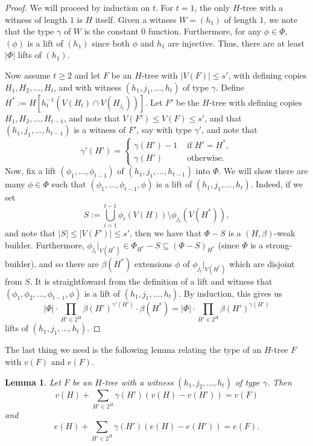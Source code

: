 \documentclass[12pt,letterpaper]{article}
\newtheorem{lemma}[theorem]{Lemma}
\theoremstyle{definition}
\begin{document}
	\begin{proof}
		We will proceed by induction on $t$. For $t=1$, the only $H$-tree with a witness of length $1$ is $H$ itself. Given a witness $W=(h_1)$ of length $1$, we note that the type $\gamma$ of $W$ is the constant $0$ function. Furthermore, for any $\phi\in \Phi$, $(\phi)$ is a lift of $(h_1)$ since both $\phi$ and $h_1$ are injective. Thus, there are at least $|\Phi|$ lifts of $(h_1)$.
		
		Now assume $t\geq 2$ and let $F$ be an $H$-tree with $|V(F)|\leq s'$, with defining copies $H_1,H_2,\dots,H_t$, and with witness $(h_1,j_1,\dots,h_t)$ of type $\gamma$. Define $H^*:=H[h_t^{-1}(V(H_t)\cap V(H_{j_t}))]$. Let $F'$ be the $H$-tree with defining copies $H_1,H_2,\dots,H_{t-1}$, and note that $V(F')\leq V(F)\leq s'$, and that $(h_1,j_1,\dots,h_{t-1})$ is a witness of $F'$, say with type $\gamma'$, and note that
		\[
		\gamma'(H')=\begin{cases}
			\gamma(H')-1&\text{ if }H'=H^*,\\
			\gamma(H')&\text{ otherwise}.
		\end{cases}
		\]
		Now, fix a lift $(\phi_1,\dots,\phi_{t-1})$ of $(h_1,j_1,\dots,h_{t-1})$ into $\Phi$. We will show there are many $\phi\in \Phi$ such that $(\phi_1,\dots,\phi_{t-1},\phi)$ is a lift of $(h_1,j_1,\dots,h_t)$. Indeed, if we set 
		\[
		S:=\bigcup_{i=1}^{t-1}\phi_i(V(H))\setminus \phi_{j_t}(V(H^*)),
		\]
		and note that $|S|\leq |V(F')|\leq s'$, then we have that $\Phi-S$ is a $(H,\beta)$-weak builder. Furthermore, $\phi_{j_t}|_{V(H^*)}\in \Phi_{H^*}-S\subseteq (\Phi-S)_{H^*}$ (since $\Phi$ is a strong-builder), and so there are $\beta(H^*)$ extensions $\phi$ of $\phi_{j_t}|_{V(H^*)}$ which are disjoint from $S$. It is straightfoward from the definition of a lift and witness that $(\phi_1,\phi_2,\dots,\phi_{t-1},\phi)$ is a lift of $(h_1,j_1,\dots,h_t)$. By induction, this gives us
		\[
		|\Phi|\cdot\prod_{H'\in 2^H} \beta(H')^{\gamma'(H')}\cdot \beta(H^*)=|\Phi|\cdot\prod_{H'\in 2^H} \beta(H')^{\gamma(H')}
		\]
		lifts of $(h_1,j_1,\dots,h_t)$.
	\end{proof}
	
	The last thing we need is the following lemma relating the type of an $H$-tree $F$ with $v(F)$ and $e(F)$.
	\begin{lemma}\label{lemma counting v and e in a tree}
		Let $F$ be an $H$-tree with a witness $(h_1,j_2,\dots,h_t)$ of type $\gamma$. Then
		\[
		v(H)+\sum_{H'\in 2^H} \gamma(H')(v(H)-v(H'))=v(F)
		\]
		and
		\[
		e(H)+\sum_{H'\in 2^H} \gamma(H')(e(H)-e(H'))=e(F).
		\]
	\end{lemma}
	
\end{document}

